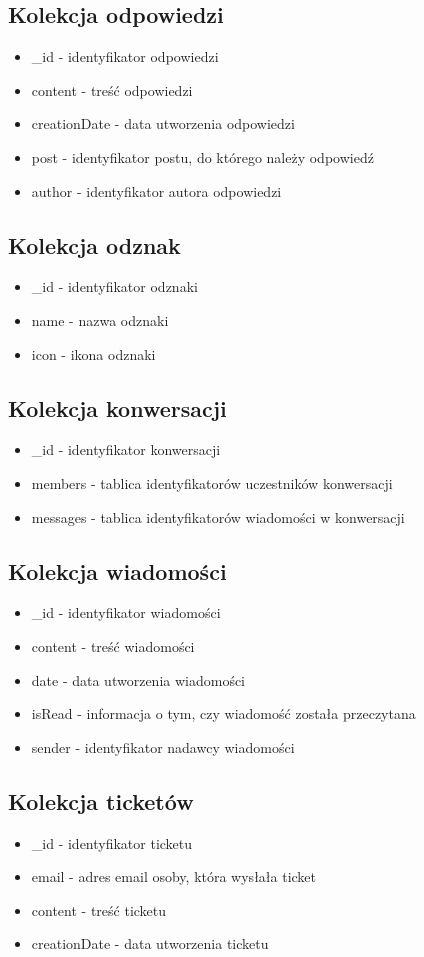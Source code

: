 \documentclass{article}
\begin{document}
\subsection{Kolekcja odpowiedzi}
\begin{itemize}
  \item \_id - identyfikator odpowiedzi
  \item content - treść odpowiedzi
  \item creationDate - data utworzenia odpowiedzi
  \item post - identyfikator postu, do którego należy odpowiedź
  \item author - identyfikator autora odpowiedzi
\end{itemize}
\subsection{Kolekcja odznak}
\begin{itemize}
  \item \_id - identyfikator odznaki
  \item name - nazwa odznaki
  \item icon - ikona odznaki
\end{itemize}
\subsection{Kolekcja konwersacji}
\begin{itemize}
  \item \_id - identyfikator konwersacji
  \item members - tablica identyfikatorów uczestników konwersacji
  \item messages - tablica identyfikatorów wiadomości w konwersacji
\end{itemize}
\subsection{Kolekcja wiadomości}
\begin{itemize}
  \item \_id - identyfikator wiadomości
  \item content - treść wiadomości
  \item date - data utworzenia wiadomości
  \item isRead - informacja o tym, czy wiadomość została przeczytana
  \item sender - identyfikator nadawcy wiadomości
\end{itemize}
\subsection{Kolekcja ticketów}
\begin{itemize}
  \item \_id - identyfikator ticketu
  \item email - adres email osoby, która wysłała ticket
  \item content - treść ticketu
  \item creationDate - data utworzenia ticketu
\end{itemize}
\end{document}
